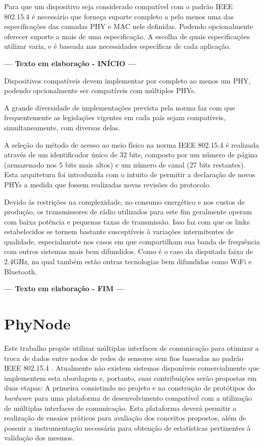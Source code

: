 \documentclass[
	12pt,				%
	openright,			%
	oneside,
	a4paper,			%
	english,			%
	french,				%
	spanish,			%
	brazil				%
	]{abntex2}
\begin{document}
Para que um dispositivo seja considerado compatível com o padrão IEEE 802.15.4 é necessário que forneça suporte completo a pelo menos uma das especificações das camadas PHY e MAC nele definidas. Podendo opcionalmente oferecer suporte a mais de uma especificação. A escolha de quais especificações utilizar varia, e é baseada nas necessidades específicas de cada aplicação.

\begin{center}
	\textbf{--- Texto em elaboração - INÍCIO ---}
\end{center}
Dispositivos compatíveis devem implementar por completo ao menos um PHY, podendo opcionalmente ser compatíveis com múltiplos PHYs.

A grande diversidade de  implementações prevista pela norma faz com que frequentemente as legislações vigentes em cada país sejam compatíveis, simultaneamente, com diversas delas.


A seleção do método de acesso ao meio físico na norma IEEE 802.15.4 é realizada através de um identificador único de 32 bits, composto por um número de página (armazenado nos 5 bits mais altos) e um número de canal (27 bits restantes). Esta arquitetura foi introduzida com o intuito de permitir a declaração de novos PHYs a medida que fossem realizadas novas revisões do protocolo. 

Devido às restrições na complexidade, no consumo energético e nos custos de produção, os transmissores de rádio utilizados para este fim geralmente operam com baixa potência e pequenas taxas de transmissão. Isso faz com que os links estabelecidos se tornem bastante susceptíveis à variações intermitentes de qualidade, especialmente nos casos em que compartilham sua banda de frequência com outros sistemas mais bem difundidos. Como é o caso da disputada faixa de 2.4GHz, na qual também estão outras tecnologias bem difundidas como WiFi e Bluetooth.

\begin{center}
	\textbf{--- Texto em elaboração - FIM ---}
\end{center}

\chapter{PhyNode} \label{phynode}

Este trabalho propõe utilizar múltiplas interfaces de comunicação para otimizar a troca de dados entre nodos de redes de sensores sem fios baseadas no padrão IEEE 802.15.4 \cite{IEEE2016}. Atualmente não existem sistemas disponíveis comercialmente que implementem esta abordagem e, portanto, suas contribuições serão propostas em duas etapas: A primeira consistindo no projeto e na construção de protótipos do \textit{hardware} para uma plataforma de desenvolvimento compatível com a utilização de múltiplas interfaces de comunicação. Esta plataforma deverá permitir a realização de ensaios práticos para avaliação dos conceitos propostos, além de possuir a instrumentação necessária para obtenção de estatísticas pertinentes à validação dos mesmos. 
\end{document}
